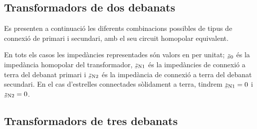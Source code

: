 \subsection{Transformadors de dos debanats}

Es presenten a continuaci\'{o} les diferents combinacions possibles de tipus de connexi\'{o} de primari i secundari, amb el seu circuit homopolar equivalent.

En tots els casos les imped\`{a}ncies representades s\'{o}n valors en per unitat; $\cmplx{z}_0$ \'{e}s la imped\`{a}ncia homopolar del transformador, $\cmplx{z}\ped{N1}$ \'{e}s la imped\`{a}ncies de connexi\'{o} a terra del debanat primari i $\cmplx{z}\ped{N2}$ \'{e}s  la imped\`{a}ncia de connexi\'{o} a terra del debanat secundari. En el cas d'estrelles connectades s\`{o}lidament a terra, tindrem $\cmplx{z}\ped{N1}=0$ i $\cmplx{z}\ped{N2}=0$.

\begin{center}
    
\end{center}

\vspace{0.4cm}
\begin{center}
    
\end{center}

\vspace{0.4cm}
\begin{center}
    
\end{center}

\vspace{0.4cm}
\begin{center}
    
\end{center}

\vspace{0.4cm}
\begin{center}
    
\end{center}

\vspace{0.4cm}
\begin{center}
    
\end{center}




\subsection{Transformadors de tres debanats}

